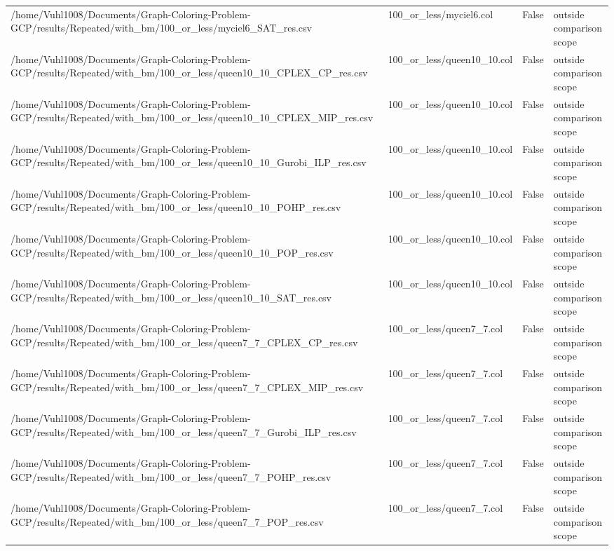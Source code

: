 \begin{table}[htbp]
\begin{tabular}{llll}
/home/Vuhl1008/Documents/Graph-Coloring-Problem-GCP/results/Repeated/with\_bm/100\_or\_less/myciel6\_SAT\_res.csv & 100\_or\_less/myciel6.col & False & outside comparison scope \\
/home/Vuhl1008/Documents/Graph-Coloring-Problem-GCP/results/Repeated/with\_bm/100\_or\_less/queen10\_10\_CPLEX\_CP\_res.csv & 100\_or\_less/queen10\_10.col & False & outside comparison scope \\
/home/Vuhl1008/Documents/Graph-Coloring-Problem-GCP/results/Repeated/with\_bm/100\_or\_less/queen10\_10\_CPLEX\_MIP\_res.csv & 100\_or\_less/queen10\_10.col & False & outside comparison scope \\
/home/Vuhl1008/Documents/Graph-Coloring-Problem-GCP/results/Repeated/with\_bm/100\_or\_less/queen10\_10\_Gurobi\_ILP\_res.csv & 100\_or\_less/queen10\_10.col & False & outside comparison scope \\
/home/Vuhl1008/Documents/Graph-Coloring-Problem-GCP/results/Repeated/with\_bm/100\_or\_less/queen10\_10\_POHP\_res.csv & 100\_or\_less/queen10\_10.col & False & outside comparison scope \\
/home/Vuhl1008/Documents/Graph-Coloring-Problem-GCP/results/Repeated/with\_bm/100\_or\_less/queen10\_10\_POP\_res.csv & 100\_or\_less/queen10\_10.col & False & outside comparison scope \\
/home/Vuhl1008/Documents/Graph-Coloring-Problem-GCP/results/Repeated/with\_bm/100\_or\_less/queen10\_10\_SAT\_res.csv & 100\_or\_less/queen10\_10.col & False & outside comparison scope \\
/home/Vuhl1008/Documents/Graph-Coloring-Problem-GCP/results/Repeated/with\_bm/100\_or\_less/queen7\_7\_CPLEX\_CP\_res.csv & 100\_or\_less/queen7\_7.col & False & outside comparison scope \\
/home/Vuhl1008/Documents/Graph-Coloring-Problem-GCP/results/Repeated/with\_bm/100\_or\_less/queen7\_7\_CPLEX\_MIP\_res.csv & 100\_or\_less/queen7\_7.col & False & outside comparison scope \\
/home/Vuhl1008/Documents/Graph-Coloring-Problem-GCP/results/Repeated/with\_bm/100\_or\_less/queen7\_7\_Gurobi\_ILP\_res.csv & 100\_or\_less/queen7\_7.col & False & outside comparison scope \\
/home/Vuhl1008/Documents/Graph-Coloring-Problem-GCP/results/Repeated/with\_bm/100\_or\_less/queen7\_7\_POHP\_res.csv & 100\_or\_less/queen7\_7.col & False & outside comparison scope \\
/home/Vuhl1008/Documents/Graph-Coloring-Problem-GCP/results/Repeated/with\_bm/100\_or\_less/queen7\_7\_POP\_res.csv & 100\_or\_less/queen7\_7.col & False & outside comparison scope \\

\end{tabular}
\end{table}
